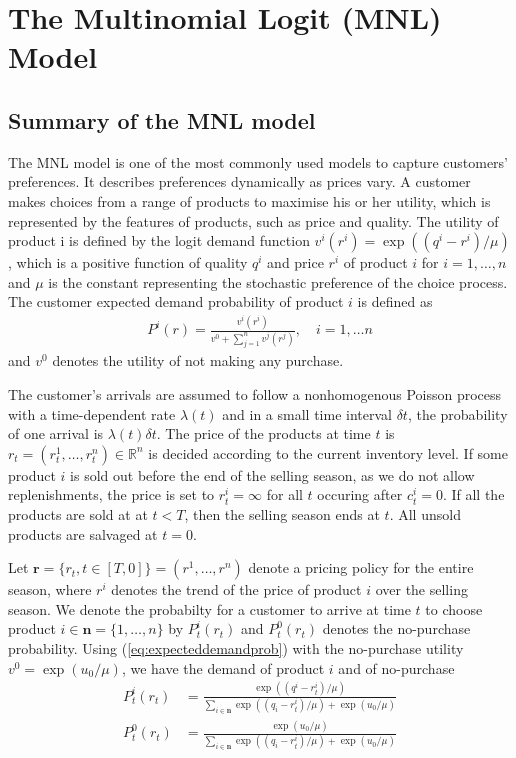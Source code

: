 \section{The Multinomial Logit (MNL) Model}


\subsection{Summary of the MNL model}
The MNL model is one of the most commonly used models to capture customers' preferences. It describes preferences dynamically as prices vary. A customer makes choices from a range of products to maximise his or her utility, which is represented by the features of products, such as price and quality. The utility of product i is defined by the logit demand function $v^i(r^i) = \exp ((q^i-r^i)/\mu)$, which is a positive function of quality $q^i$ and price $r^i$ of product $i$ for $i=1,\ldots, n$ and $\mu$ is the constant representing the stochastic preference of the choice process. The customer expected demand probability of product $i$ is defined as 
\begin{align}
P^i(r) = \frac{v^i(r^i)}{v^0+\sum_{j=1}^{n}v^j(r^j)},\quad i = 1, \ldots n\label{eq:expecteddemandprob}
\end{align}
and $v^0$ denotes the utility of not making any purchase.


The customer's arrivals are assumed to follow a nonhomogenous Poisson process with a time-dependent rate $\lambda(t)$ and in a small time interval $\delta t$, the probability of one arrival is $\lambda(t)\delta t$. The price of the products at time $t$ is $r_t = (r_t^1,\ldots,r_t^n) \in \mathbb{R}^n$ is decided according to the current inventory level. If some product $i$ is sold out before the end of the selling season, as we do not allow replenishments, the price is set to $r^i_t = \infty$ for all $t$ occuring after $c^i_t=0$. If all the products are sold at at $t < T$, then the selling season ends at $t$. All unsold products are salvaged at $t=0$. 


Let $\mathbf{r}=\{r_t, t \in [T,0]\} = (r^1, \ldots, r^n)$ denote a pricing policy for the entire season, where $r^i$ denotes the trend of the price of product $i$ over the selling season. We denote the probabilty for a customer to arrive at time $t$ to choose product $i \in \mathbf{n} = \{1,\ldots, n\}$ by $P_t^i(r_t)$ and $P_t^0(r_t)$ denotes the no-purchase probability. Using (\ref{eq:expecteddemandprob}) with the no-purchase utility $v^0 = \exp (u_0/\mu)$, we have the demand of product $i$ and of no-purchase
\begin{align}
P_t^i(r_t) &= \frac{\exp((q^i-r^i_t)/\mu)}{\sum_{i \in \mathbf{n}}\exp((q_i-r^i_t)/\mu)+\exp(u_0/\mu)} \label{eq:probi}\\
P_t^0(r_t)&= \frac{\exp(u_0/\mu)}{\sum_{i \in \mathbf{n}}\exp((q_i-r^i_t)/\mu)+\exp(u_0/\mu)}\label{eq:prob0}
\end{align}

